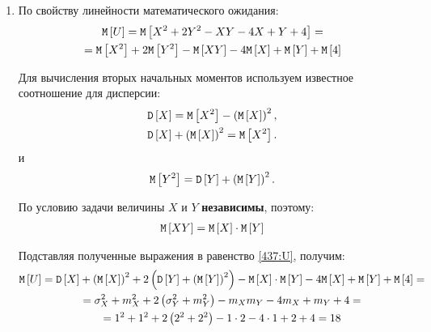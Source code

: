 \documentclass[a4paper,12pt]{article}
\begin{document}
    \begin{enumerate}
        \item По свойству линейности математического ожидания:
        \begin{multline}
            \label{437:U}
            \mathtt{M} \left [ U \right ]
            = \mathtt{M} \left [ X^2 + 2 Y^2 - XY - 4X + Y + 4 \right ] = \\
            = \mathtt{M} \left [ X^2 \right ] + 2 \mathtt{M} \left [ Y^2 \right ] - \mathtt{M} \left [ XY \right ] - 4 \mathtt{M} \left [ X \right ] + \mathtt{M} \left [ Y \right ] + \mathtt{M} \left [ 4 \right ]
        \end{multline}

        Для вычисления вторых начальных моментов используем известное соотношение для дисперсии:
        \begin{gather}
            \mathtt{D} \left [ X \right ] = \mathtt{M} \left [ X^2 \right ] - \left ( \mathtt{M} \left [ X \right ] \right )^2 , \\
            \mathtt{D} \left [ X \right ] + \left ( \mathtt{M} \left [ X \right ] \right )^2 = \mathtt{M} \left [ X^2 \right ] \label{437:X_2}.
        \end{gather}
        и
        \begin{equation}
            \label{437:Y_2}
            \mathtt{M} \left [ Y^2 \right ] = \mathtt{D} \left [ Y \right ] + \left ( \mathtt{M} \left [ Y \right ] \right )^2.
        \end{equation}

        По условию задачи величины $X$ и $Y$ \textbf{независимы}, поэтому:
        \begin{gather}
            \mathtt{M} \left [ XY \right ] = \mathtt{M} \left [ X \right ] \cdot \mathtt{M} \left [ Y \right ]
        \end{gather}

        Подставляя полученные выражения в равенство \eqref{437:U}, получим:
        \begin{multline}
            \mathtt{M} \left [ U \right ]
            = \mathtt{D} \left [ X \right ] + \left ( \mathtt{M} \left [ X \right ] \right )^2 + 2 \left ( \mathtt{D} \left [ Y \right ] + \left ( \mathtt{M} \left [ Y \right ] \right )^2 \right ) - \mathtt{M} \left [ X \right ] \cdot \mathtt{M} \left [ Y \right ] - 4 \mathtt{M} \left [ X \right ] + \mathtt{M} \left [ Y \right ] + \mathtt{M} \left [ 4 \right ] = \\
            = \sigma_X^2 + m_X^2 + 2 \left ( \sigma_Y^2 + m_Y^2 \right ) - m_X m_Y - 4 m_X + m_Y + 4 = \\
            = 1^2 + 1^2 + 2 \left ( 2^2 + 2^2 \right ) - 1 \cdot 2 - 4 \cdot 1 + 2 + 4 = 18
        \end{multline}


\end{enumerate}
\end{document}
